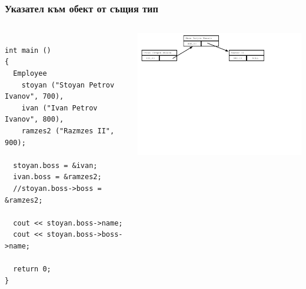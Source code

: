 \documentclass{beamer}
\begin{document}
\begin{frame}[fragile]
\frametitle{Указател към обект от същия тип}

\begin{columns}[c]
  \begin{column}{0.55\textwidth}
\begin{flushleft}
\begin{lstlisting}

int main ()
{
  Employee 
    stoyan ("Stoyan Petrov Ivanov", 700),
    ivan ("Ivan Petrov Ivanov", 800),
    ramzes2 ("Razmzes II", 900);

  stoyan.boss = &ivan;
  ivan.boss = &ramzes2;
  //stoyan.boss->boss = &ramzes2;
  
  cout << stoyan.boss->name;
  cout << stoyan.boss->boss->name;

  return 0;
}

\end{lstlisting}  
\end{flushleft}

  \end{column}
  \begin{column}{0.45\textwidth}
\hspace{-150px}
\includegraphics[width=10.5cm]{images/00_rec_obj_three_objects_linked.pdf}

  \end{column}
\end{columns}
\end{frame}
\end{document}
